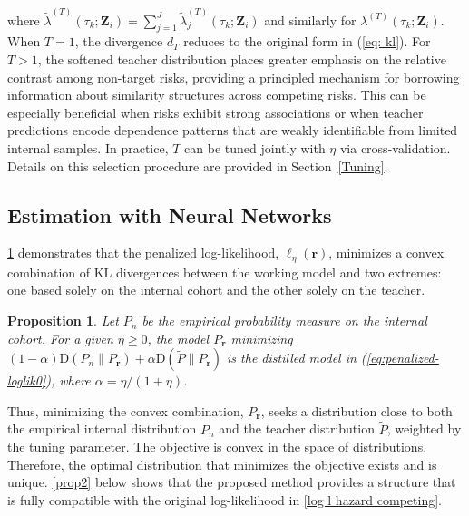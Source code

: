 \documentclass{article}
\theoremstyle{plain}
\newtheorem{proposition}[theorem]{Proposition}
\theoremstyle{definition}
\theoremstyle{remark}
\begin{document}
where $\tilde{\lambda}^{(T)}(\tau_k;\bm Z_i)=\sum_{j=1}^J
\tilde{\lambda}^{(T)}_j(\tau_k;\bm Z_i)$ and similarly for
$\lambda^{(T)}(\tau_k;\bm Z_i)$.
When $T=1$, the divergence $d_T$ reduces to the original form in (\ref{eq: kl}). For $T>1$, the softened teacher distribution places greater emphasis on the relative contrast among non-target risks, providing a principled mechanism for borrowing information about similarity structures across competing risks.
This can be especially beneficial when risks exhibit strong associations or when teacher predictions encode dependence patterns that are weakly identifiable from limited internal samples. In practice, $T$ can be tuned jointly with $\eta$ via cross-validation. Details on this selection procedure are provided in Section~\ref{Tuning}. 


\subsection{Estimation with Neural Networks}
\cref{prop1} demonstrates that the penalized log-likelihood, $\ell_{\eta}(\boldsymbol{r})$, minimizes a convex combination of KL divergences between the working model and two extremes: one based solely on the internal cohort and the other solely on the teacher.

\begin{proposition}
    \label{prop1}
  Let $P_n$ be the empirical probability measure on the internal cohort. For a given $\eta \geq 0$, the model $P_{\boldsymbol{r}}$ minimizing $(1-\alpha) \mbox{D}(P_n\parallel P_{\boldsymbol{r}}) + \alpha  \mbox{D}(\tilde{P}\parallel P_{\boldsymbol{r}})$
is the distilled model in (\ref{eq:penalized-loglik0}), where $\alpha = \eta/(1+\eta)$. 
\end{proposition}

Thus, minimizing the convex combination, $P_{\boldsymbol{r}}$, seeks a distribution close to both the empirical internal distribution $P_n$ and the teacher distribution $\tilde{P}$, weighted by the tuning parameter. The objective is convex in the space of distributions. Therefore, the optimal distribution that minimizes the objective exists and is unique. \cref{prop2} below shows that the proposed method provides a structure that 
is fully compatible with the original log-likelihood in \eqref{log l hazard competing}. 
\end{document}
